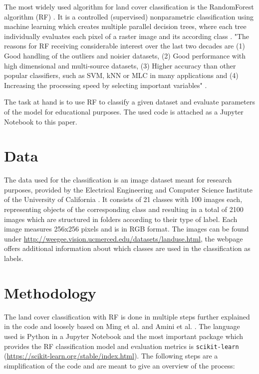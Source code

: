\documentclass[oneside,twocolumn,10pt,cleanfoot,cleanhead]{asme2ej}
\begin{document}
The most widely used algorithm for land cover classification is the RandomForest algorithm (RF) \cite{PhanEA2020}.
It is a controlled (supervised) nonparametric classification using machine learning which creates multiple parallel decision trees, where each tree individually evaluates each pixel of a raster image and its according class \cite{SvobodaEA2022}.
"The reasons for RF receiving considerable interest over the last two decades are 
(1) Good handling of the outliers and noisier datasets, 
(2) Good performance with high dimensional and multi-source datasets,
(3) Higher accuracy than other popular classifiers, such as SVM, kNN or MLC in many applications and 
(4) Increasing the processing speed by selecting important variables" \cite{PhanEA2020}.

The task at hand is to use RF to classify a given dataset and evaluate parameters of the model for educational purposes.
The used code is attached as a Jupyter Notebook to this paper.


\section{Data}

The data used for the classification is an image dataset meant for research purposes, provided by the Electrical Engineering and Computer Science Institute of the University of California \cite{YangNewsam2010}.
It consists of 21 classes with 100 images each, representing objects of the corresponding class and resulting in a total of 2100 images which are structured in folders according to their type of label.
Each image measures 256x256 pixels and is in RGB format.
The images can be found under \url{http://weegee.vision.ucmerced.edu/datasets/landuse.html}, the webpage offers additional information about which classes are used in the classification as labels.


\section{Methodology}

The land cover classification with RF is done in multiple steps further explained in the code and loosely based on Ming et al. and Amini et al. \cite{MingEA2016, AminiEA2022} .
The language used is Python in a Jupyter Notebook and the most important package which provides the RF classification model and evaluation metrics is \texttt{scikit-learn} (\url{https://scikit-learn.org/stable/index.html}).
The following steps are a simplification of the code and are meant to give an overview of the process:
\end{document}
